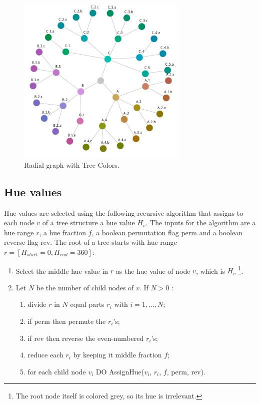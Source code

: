 \documentclass[journal]{vgtc}                %
\begin{document}
\begin{figure}[tb]

  \centering
  \includegraphics[width=3.2in]{HCPgraph.pdf}
  \caption{Radial graph with Tree Colors.}\label{fig:graph}

\end{figure}

\subsection{Hue values}
Hue values are selected using the following recursive algorithm that assigns to each node 
$v$ of a tree structure a hue value $H_{v}$. 
The inputs for the algorithm are a hue range $r$, a hue fraction $f$, a boolean permutation flag  
\textsf{perm} and a boolean reverse flag \textsf{rev}.
The root of a tree starts with hue range $r=[H_{start}=0, H_{end}=360]$:

%
\begin{enumerate} \itemsep1pt \parskip0pt 
\item Select the middle hue value in $r$ as the hue value of node $v$, which is $H_v$ \footnote{The root node itself is colored grey, so its hue is irrelevant.}.
\item Let $N$ be the number of child nodes of $v$. If $N>0$ :
\begin{enumerate}[i] \itemsep1pt \parskip0pt 
\item divide $r$ in $N$ equal parts $r_i$ with $i=1,\ldots,N$;
\item if \textsf{perm} then permute the $r_i$'s;
\item if \textsf{rev} then reverse the even-numbered $r_i$'s;
\item reduce each $r_i$ by keeping it middle fraction $f$;
\item for each child node $v_i$ DO AssignHue($v_i$, $r_i$, $f$, \textsf{perm}, \textsf{rev}).
\end{enumerate}
\end{enumerate}
\end{document}
